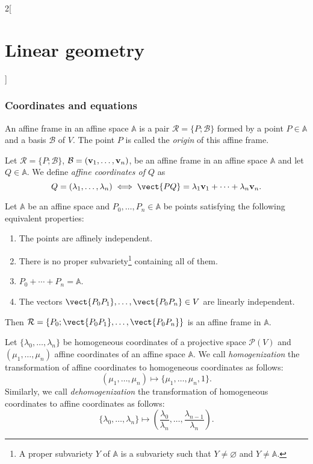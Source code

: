 \documentclass[../../../main.tex]{subfiles}
\begin{document}
\begin{multicols}{2}[\section{Linear geometry}]
  \subsubsection{Coordinates and equations}
  \begin{definition}
    An affine frame in an affine space $\mathbb{A}$ is a pair $\mathcal{R}=\{P;\mathcal{B}\}$ formed by a point $P\in\mathbb{A}$ and a basis $\mathcal{B}$ of $V$. The point $P$ is called the \textit{origin} of this affine frame.
  \end{definition}
  \begin{definition}
    Let $\mathcal{R}=\{P;\mathcal{B}\}$, $\mathcal{B}=(\boldsymbol{\mathrm{v}}_1,\ldots,\boldsymbol{\mathrm{v}}_n)$, be an affine frame in an affine space $\mathbb{A}$ and let $Q\in\mathbb{A}$. We define \textit{affine coordinates of $Q$} as $$Q=(\lambda_1,\ldots,\lambda_n)\iff\vect{PQ}=\lambda_1\vectorfunction{v}_1+\cdots+\lambda_n\vectorfunction{v}_n.$$
  \end{definition}
  \begin{prop}
    Let $\mathbb{A}$ be an affine space and $P_0,\ldots,P_n\in\mathbb{A}$ be points satisfying the following equivalent properties:
    \begin{enumerate}
      \item The points are affinely independent.
      \item There is no proper subvariety\footnote{A proper subvariety $Y$ of $\mathbb{A}$ is a subvariety such that $Y\ne\varnothing$ and  $Y\ne\mathbb{A}$.} containing all of them.
      \item $P_0+\cdots+P_n=\mathbb{A}$.
      \item The vectors $\vect{P_0P_1},\ldots,\vect{P_0P_n}\in V$ are linearly independent.
    \end{enumerate}
    Then $\mathcal{R}=\{P_0;\vect{P_0P_1},\ldots,\vect{P_0P_n}\}$ is an affine frame in $\mathbb{A}$.
  \end{prop}
  \begin{definition}
    Let $\{\lambda_0,\ldots,\lambda_n\}$ be homogeneous coordinates of a projective space $\mathcal{P}(V)$ and $(\mu_1,\ldots,\mu_n)$ affine coordinates of an affine space $\mathbb{A}$. We call \textit{homogenization} the transformation of affine coordinates to homogeneous coordinates as follows: $$(\mu_1,\ldots,\mu_n)\longmapsto\{\mu_1,\ldots,\mu_n,1\}.$$ Similarly, we call \textit{dehomogenization} the transformation of homogeneous coordinates to affine coordinates as follows: $$\{\lambda_0,\ldots,\lambda_n\}\longmapsto\left(\frac{\lambda_0}{\lambda_n},\ldots,\frac{\lambda_{n-1}}{\lambda_n}\right).$$

\end{definition}
\end{multicols}
\end{document}

